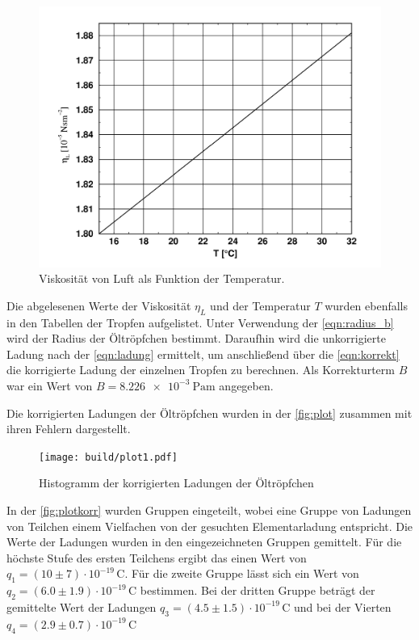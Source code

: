 \begin{figure}[H]
    \centering
	\includegraphics[width=0.75\linewidth]{content/grafik/graph.png}
	\captionsetup{width=0.925\linewidth}
	\caption{Viskosität von Luft als Funktion der Temperatur.\cite{millikan}}
	\label{fig:graph}
\end{figure}

Die abgelesenen Werte der Viskosität $\eta_L$ und der Temperatur $T$ wurden ebenfalls in den Tabellen der Tropfen aufgelistet.
Unter Verwendung der \autoref{eqn:radius_b} wird der Radius der Öltröpfchen bestimmt.
Daraufhin wird die unkorrigierte Ladung nach der \autoref{eqn:ladung} ermittelt, um anschließend 
über die \autoref{eqn:korrekt} die korrigierte Ladung der einzelnen Tropfen zu berechnen. Als Korrekturterm $B$ war ein
Wert von $B = \qty{8.226e-3}{\pascal\meter}$ angegeben.

Die korrigierten Ladungen der Öltröpfchen wurden in der \autoref{fig:plot} zusammen mit ihren Fehlern dargestellt.

\begin{figure}[H]
    \centering
    \texttt{[image: build/plot1.pdf]}
    \caption{Histogramm der korrigierten Ladungen der Öltröpfchen}
    \label{fig:plot}
\end{figure}

In der \autoref{fig:plotkorr} wurden Gruppen eingeteilt, wobei eine Gruppe von Ladungen von Teilchen einem Vielfachen von der
gesuchten Elementarladung entspricht. Die Werte der Ladungen wurden in den eingezeichneten Gruppen gemittelt. Für die höchste
Stufe des ersten Teilchens ergibt das einen Wert von $ q_1 = (10 \pm 7) \cdot 10^{-19} \, \mathrm{C}$. Für die zweite Gruppe
lässt sich ein Wert von $q_2 = (6.0 \pm 1.9) \cdot 10^{-19} \, \mathrm{C}$ bestimmen. Bei der dritten Gruppe beträgt der gemittelte 
Wert der Ladungen $q_3 = (4.5 \pm 1.5) \cdot 10^{-19} \, \mathrm{C}$ und bei der Vierten $q_4 = (2.9 \pm 0.7) \cdot 10^{-19} \, \mathrm{C}$

